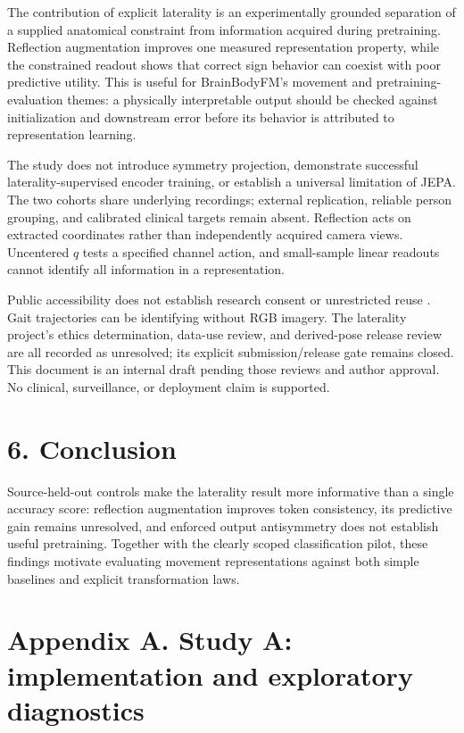 \documentclass{article}
\begin{document}
The contribution of explicit laterality is an experimentally grounded
separation of a supplied anatomical constraint from information acquired
during pretraining. Reflection augmentation improves one measured
representation property, while the constrained readout shows that
correct sign behavior can coexist with poor predictive utility. This is
useful for BrainBodyFM's movement and pretraining-evaluation themes: a
physically interpretable output should be checked against initialization
and downstream error before its behavior is attributed to representation
learning.

The study does not introduce symmetry projection, demonstrate successful
laterality-supervised encoder training, or establish a universal
limitation of JEPA. The two cohorts share underlying recordings;
external replication, reliable person grouping, and calibrated clinical
targets remain absent. Reflection acts on extracted coordinates rather
than independently acquired camera views. Uncentered \(q\) tests a
specified channel action, and small-sample linear readouts cannot
identify all information in a representation.

Public accessibility does not establish research consent or unrestricted
reuse \citep{gavdRepo2026}. Gait trajectories can be identifying without
RGB imagery. The laterality project's ethics determination, data-use
review, and derived-pose release review are all recorded as unresolved;
its explicit submission/release gate remains closed. This document is an
internal draft pending those reviews and author approval. No clinical,
surveillance, or deployment claim is supported.

\section{6. Conclusion}\label{conclusion}

Source-held-out controls make the laterality result more informative
than a single accuracy score: reflection augmentation improves token
consistency, its predictive gain remains unresolved, and enforced output
antisymmetry does not establish useful pretraining. Together with the
clearly scoped classification pilot, these findings motivate evaluating
movement representations against both simple baselines and explicit
transformation laws.

\FloatBarrier\clearpage

\section{Appendix A. Study A: implementation and exploratory
diagnostics}\label{appendix-a.-study-a-implementation-and-exploratory-diagnostics}
\end{document}
